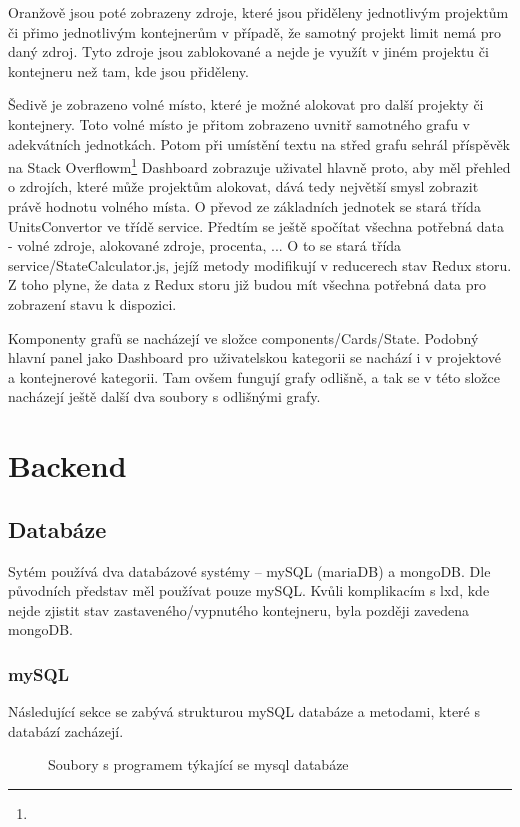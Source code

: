 \documentclass[a4paper,oneside,12pt]{report}
\begin{document}
Oranžově jsou poté zobrazeny zdroje, které jsou přiděleny jednotlivým projektům či přimo jednotlivým kontejnerům v případě, že samotný projekt limit nemá pro daný zdroj.
Tyto zdroje jsou zablokované a nejde je využít v jiném projektu či kontejneru než tam, kde jsou přiděleny.

Šedivě je zobrazeno volné místo, které je možné alokovat pro další projekty či kontejnery.
Toto volné místo je přitom zobrazeno uvnitř samotného grafu v adekvátních jednotkách.
Potom při umístění textu na střed grafu sehrál příspěvěk na Stack Overflowm\footnote{}   Dashboard zobrazuje uživatel hlavně proto, aby měl přehled o zdrojích, které může projektům alokovat, dává tedy největší smysl zobrazit právě hodnotu volného místa.
O převod ze základních jednotek se stará třída UnitsConvertor ve třídě service.
Předtím se ještě spočítat všechna potřebná data - volné zdroje, alokované zdroje, procenta, ... O to se stará třída service/StateCalculator.js, jejíž metody modifikují v reducerech stav Redux storu.
Z toho plyne, že data z Redux storu již budou mít všechna potřebná data pro zobrazení stavu k dispozici.

Komponenty grafů se nacházejí ve složce components/Cards/State.
Podobný hlavní panel jako Dashboard pro uživatelskou kategorii se nachází i v projektové a kontejnerové kategorii.
Tam ovšem fungují grafy odlišně, a tak se v této složce nacházejí ještě další dva soubory s odlišnými grafy.

\chapter{Backend}


\section{Databáze}

Sytém používá dva databázové systémy -- mySQL (mariaDB) a mongoDB.
Dle původních představ měl používat pouze mySQL.
Kvůli komplikacím s lxd, kde nejde zjistit stav zastaveného/vypnutého kontejneru, byla později zavedena mongoDB.

\subsection{mySQL}
Následující sekce se zabývá strukturou mySQL databáze a metodami, které s databází zacházejí.


\begin{figure}[h]
	\caption[Soubory s programem týkající se mysql databáze, vlastni tvorba]{Soubory s programem týkající se mysql databáze}
	\label{fig:sqlClasses}
\end{figure}
\end{document}
